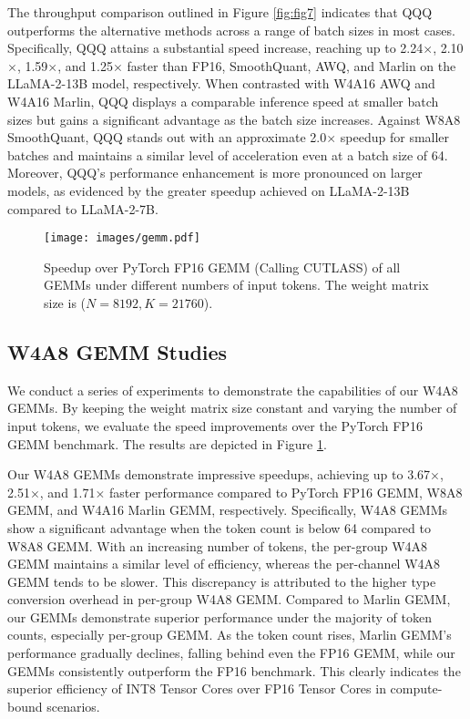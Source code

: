 The throughput comparison outlined in Figure \ref{fig:fig7} indicates that QQQ outperforms the alternative methods across a range of batch sizes in most cases. Specifically, QQQ attains a substantial speed increase, reaching up to 2.24$\times$, 2.10$\times$, 1.59$\times$, and 1.25$\times$ faster than FP16, SmoothQuant, AWQ, and Marlin on the LLaMA-2-13B model, respectively. When contrasted with W4A16 AWQ and W4A16 Marlin, QQQ displays a comparable inference speed at smaller batch sizes but gains a significant advantage as the batch size increases. Against W8A8 SmoothQuant, QQQ stands out with an approximate 2.0$\times$ speedup for smaller batches and maintains a similar level of acceleration even at a batch size of 64. Moreover, QQQ's performance enhancement is more pronounced on larger models, as evidenced by the greater speedup achieved on LLaMA-2-13B compared to LLaMA-2-7B.

\begin{figure}[ht]
\centering
\texttt{[image: images/gemm.pdf]}
\caption{Speedup over PyTorch FP16 GEMM (Calling CUTLASS) of all GEMMs under different numbers of input tokens. The weight matrix size is ($N=8192, K=21760$).}
\label{fig:fig8}
\vspace{-0.1in}
\end{figure}

\subsection{W4A8 GEMM Studies} 
We conduct a series of experiments to demonstrate the capabilities of our W4A8 GEMMs. By keeping the weight matrix size constant and varying the number of input tokens, we evaluate the speed improvements over the PyTorch FP16 GEMM benchmark. The results are depicted in Figure \ref{fig:fig8}.

Our W4A8 GEMMs demonstrate impressive speedups, achieving up to 3.67$\times$, 2.51$\times$, and 1.71$\times$ faster performance compared to PyTorch FP16 GEMM, W8A8 GEMM, and W4A16 Marlin GEMM, respectively. Specifically, W4A8 GEMMs show a significant advantage when the token count is below 64 compared to W8A8 GEMM. With an increasing number of tokens, the per-group W4A8 GEMM maintains a similar level of efficiency, whereas the per-channel W4A8 GEMM tends to be slower. This discrepancy is attributed to the higher type conversion overhead in per-group W4A8 GEMM.
Compared to Marlin GEMM, our GEMMs demonstrate superior performance under the majority of token counts, especially per-group GEMM.
As the token count rises, Marlin GEMM's performance gradually declines, falling behind even the FP16 GEMM, while our GEMMs consistently outperform the FP16 benchmark. This clearly indicates the superior efficiency of INT8 Tensor Cores over FP16 Tensor Cores in compute-bound scenarios.

